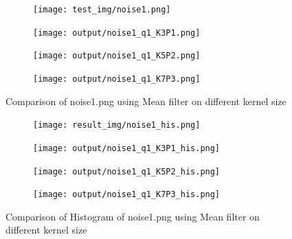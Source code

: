 \documentclass[12pt,a4paper]{report}
\begin{document}
\begin{figure}[!htb]
  \begin{minipage}{\linewidth}
    \centering
    \begin{subfigure}{0.49\textwidth}
      \texttt{[image: test\_img/noise1.png]}
    \end{subfigure}
    \begin{subfigure}{0.49\textwidth}
      \texttt{[image: output/noise1\_q1\_K3P1.png]}
    \end{subfigure}

    \begin{subfigure}{0.49\textwidth}
      \texttt{[image: output/noise1\_q1\_K5P2.png]}
    \end{subfigure}
    \begin{subfigure}{0.49\textwidth}
      \texttt{[image: output/noise1\_q1\_K7P3.png]}
    \end{subfigure}

  \caption{Comparison of noise1.png using Mean filter on different kernel size}
  \end{minipage}

\end{figure}
\begin{figure}[!htb]
  \begin{minipage}{\linewidth}
    \centering
    \begin{subfigure}{1\textwidth}
      \texttt{[image: result\_img/noise1\_his.png]}
    \end{subfigure}
    \begin{subfigure}{1\textwidth}
      \texttt{[image: output/noise1\_q1\_K3P1\_his.png]}
    \end{subfigure}

    \begin{subfigure}{1\textwidth}
      \texttt{[image: output/noise1\_q1\_K5P2\_his.png]}
    \end{subfigure}
    \begin{subfigure}{1\textwidth}
      \texttt{[image: output/noise1\_q1\_K7P3\_his.png]}
    \end{subfigure}
    
  \caption{Comparison of Histogram of noise1.png using Mean filter on different kernel size}
\label{fig:n1-mean-hist}
\end{minipage}
\end{figure}
\end{document}
